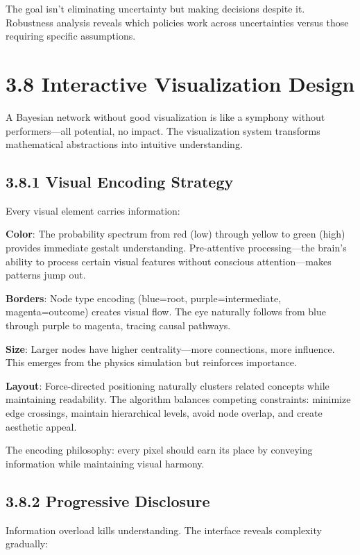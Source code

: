 \documentclass[
  11pt,
  letterpaper,
  openany]{book}
\begin{document}
The goal isn't eliminating uncertainty but making decisions despite it.
Robustness analysis reveals which policies work across uncertainties
versus those requiring specific assumptions.

\section{3.8 Interactive Visualization
Design}\label{sec-visualization-design}

A Bayesian network without good visualization is like a symphony without
performers---all potential, no impact. The visualization system
transforms mathematical abstractions into intuitive understanding.

\subsection{3.8.1 Visual Encoding Strategy}\label{sec-visual-encoding}

Every visual element carries information:

\textbf{Color}: The probability spectrum from red (low) through yellow
to green (high) provides immediate gestalt understanding. Pre-attentive
processing---the brain's ability to process certain visual features
without conscious attention---makes patterns jump out.

\textbf{Borders}: Node type encoding (blue=root, purple=intermediate,
magenta=outcome) creates visual flow. The eye naturally follows from
blue through purple to magenta, tracing causal pathways.

\textbf{Size}: Larger nodes have higher centrality---more connections,
more influence. This emerges from the physics simulation but reinforces
importance.

\textbf{Layout}: Force-directed positioning naturally clusters related
concepts while maintaining readability. The algorithm balances competing
constraints: minimize edge crossings, maintain hierarchical levels,
avoid node overlap, and create aesthetic appeal.

The encoding philosophy: every pixel should earn its place by conveying
information while maintaining visual harmony.

\subsection{3.8.2 Progressive
Disclosure}\label{sec-progressive-disclosure}

Information overload kills understanding. The interface reveals
complexity gradually:
\end{document}
